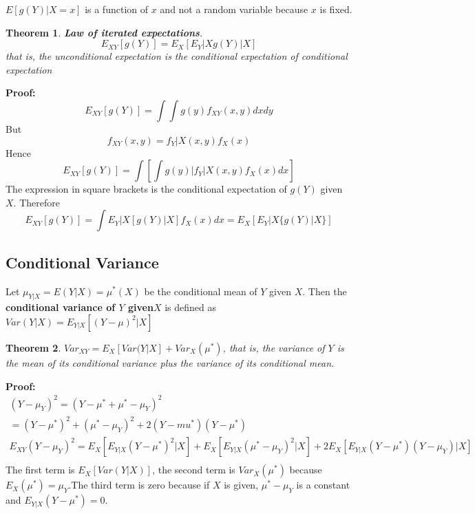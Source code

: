 \documentclass{article}
\newtheorem{theorem}{Theorem}[section]
\begin{document}
\(E[g(Y)|X=x]\) is a function of \(x\) and not a random variable because \(x\) is fixed.

\begin{theorem}
    \textbf{Law of iterated expectations}.\\
    \begin{equation*}
        E_{XY}[g(Y)]=E_X[E_Y|X {g(Y)|X}]
    \end{equation*}
    that is, the unconditional expectation is the conditional expectation of conditional expectation
\end{theorem}

\textbf{Proof:} 
\begin{equation*}
    E_{XY}[g(Y)]=\int\int g(y) f_{XY}(x,y) dxdy    
\end{equation*}
But
\begin{equation*}
    f_{XY}(x,y)=f_Y|X(x,y)f_X(x)
\end{equation*}
Hence
\begin{equation*}
    E_{XY}[g(Y)]=\int\left[\int g(y)|f_Y|X(x,y)f_X(x)dx\right]
\end{equation*}
The expression in square brackets is the conditional expectation of \(g(Y)\) given \(X\). Therefore
\begin{equation*}
    E_{XY}[g(Y)]=\int E_Y|X[g(Y)|X] f_X(x)dx=E_X[E_Y|X\{g(Y)|X\}]
\end{equation*}

\subsection{Conditional Variance}

Let \(\mu_{Y|X}=E(Y|X)=\mu^*(X)\) be the conditional mean of \(Y\) given \(X\). Then the \textbf{conditional variance of \(Y\) given\(X\)} is defined as \(Var(Y|X)=E_{Y|X}[(Y-\mu)^2|X]\)

\begin{theorem}
    \(Var_{XY}=E_X[Var(Y|X]+Var_X(\mu^*)\), that is, the variance of \(Y\) is the mean of its conditional variance plus the variance of its conditional mean.
\end{theorem}

\textbf{Proof:} 
\begin{equation*}
    \begin{split}
        (Y-\mu_Y)^2=(Y-\mu^*+\mu^*-\mu_Y)^2 \\
        = (Y-\mu^*)^2+(\mu^*-\mu_Y)^2+2(Y-mu^*)(Y-\mu^*)\\
        E_{XY}(Y-\mu_Y)^2=E_X[E_{Y|X}(Y-\mu^*)^2|X]+E_X[E_{Y|X}(\mu^*-\mu_Y)^2|X]+2E_X[E_{Y|X}(Y-\mu^*)(Y-\mu_Y)|X]\\  
    \end{split}
\end{equation*}
The first term is \(E_X[Var(Y|X)]\), the second term is \(Var_X(\mu^*)\) because \(E_X(\mu^*)=\mu_Y\).The third term is zero because if \(X\) is given, \(\mu^*-\mu_Y\) is a constant and \(E_{Y|X}(Y-\mu^*)=0\).
\end{document}
